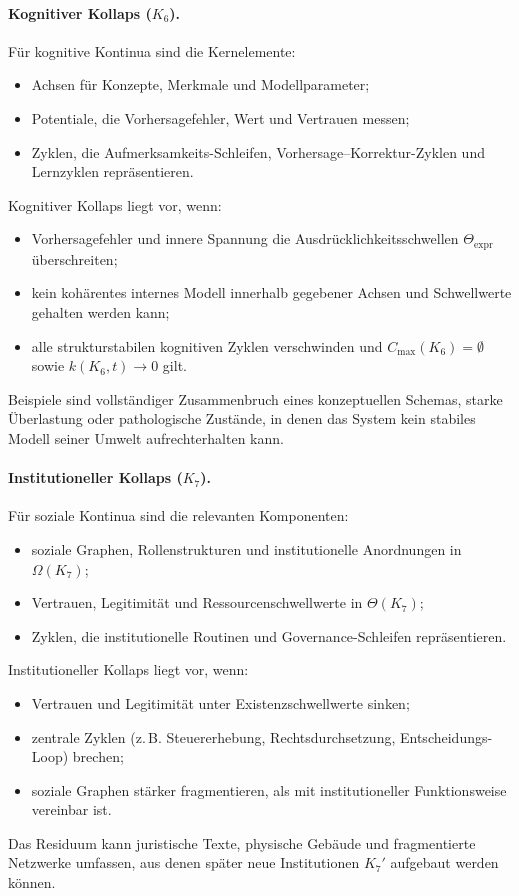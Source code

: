 \paragraph{Kognitiver Kollaps (\texorpdfstring{\(K_6\)}{K_6}).}
Für kognitive Kontinua sind die Kernelemente:
\begin{itemize}
  \item Achsen für Konzepte, Merkmale und Modellparameter;
  \item Potentiale, die Vorhersagefehler, Wert und Vertrauen messen;
  \item Zyklen, die Aufmerksamkeits-Schleifen, Vorhersage--Korrektur-Zyklen
        und Lernzyklen repräsentieren.
\end{itemize}
Kognitiver Kollaps liegt vor, wenn:
\begin{itemize}
  \item Vorhersagefehler und innere Spannung die Ausdrücklichkeitsschwellen
        \(\Theta_{\mathrm{expr}}\) überschreiten;
  \item kein kohärentes internes Modell innerhalb gegebener Achsen und
        Schwellwerte gehalten werden kann;
  \item alle strukturstabilen kognitiven Zyklen verschwinden und
        \(C_{\max}(K_6)=\emptyset\) sowie \(k(K_6,t)\to 0\) gilt.
\end{itemize}
Beispiele sind vollständiger Zusammenbruch eines konzeptuellen Schemas, starke
Überlastung oder pathologische Zustände, in denen das System kein stabiles Modell
seiner Umwelt aufrechterhalten kann.

\paragraph{Institutioneller Kollaps (\texorpdfstring{\(K_7\)}{K_7}).}
Für soziale Kontinua sind die relevanten Komponenten:
\begin{itemize}
  \item soziale Graphen, Rollenstrukturen und institutionelle Anordnungen in
        \(\Omega(K_7)\);
  \item Vertrauen, Legitimität und Ressourcenschwellwerte in \(\Theta(K_7)\);
  \item Zyklen, die institutionelle Routinen und Governance-Schleifen
        repräsentieren.
\end{itemize}
Institutioneller Kollaps liegt vor, wenn:
\begin{itemize}
  \item Vertrauen und Legitimität unter Existenzschwellwerte sinken;
  \item zentrale Zyklen (z.\,B. Steuererhebung, Rechtsdurchsetzung,
        Entscheidungs-Loop) brechen;
  \item soziale Graphen stärker fragmentieren, als mit institutioneller
        Funktionsweise vereinbar ist.
\end{itemize}
Das Residuum kann juristische Texte, physische Gebäude und fragmentierte
Netzwerke umfassen, aus denen später neue Institutionen \(K_7'\) aufgebaut
werden können.

